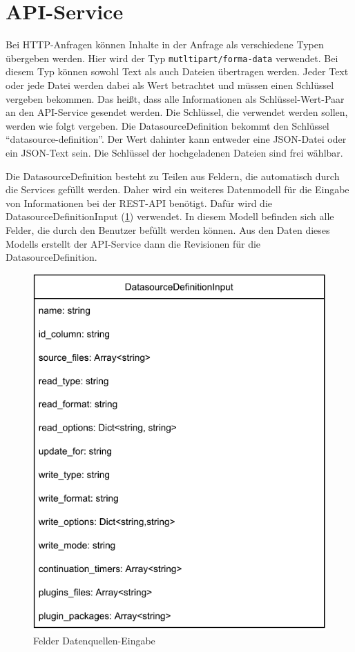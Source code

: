 \section{API-Service}

Bei HTTP-Anfragen können Inhalte in der Anfrage als verschiedene Typen übergeben werden.
Hier wird der Typ \verb|mutltipart/forma-data| verwendet.
Bei diesem Typ können sowohl Text als auch Dateien übertragen werden.
Jeder Text oder jede Datei werden dabei als Wert betrachtet und müssen einen Schlüssel vergeben bekommen.
Das heißt, dass alle Informationen als Schlüssel-Wert-Paar an den API-Service gesendet werden.
Die Schlüssel, die verwendet werden sollen, werden wie folgt vergeben.
Die DatasourceDefinition bekommt den Schlüssel "`datasource-definition"'.
Der Wert dahinter kann entweder eine JSON-Datei oder ein JSON-Text sein.
Die Schlüssel der hochgeladenen Dateien sind frei wählbar.

Die DatasourceDefinition besteht zu Teilen aus Feldern, die automatisch durch die Services gefüllt werden.
Daher wird ein weiteres Datenmodell für die Eingabe von Informationen bei der REST-API benötigt.
Dafür wird die DatasourceDefinitionInput (\cref{fig:datasource-definition-input}) verwendet.
In diesem Modell befinden sich alle Felder, die durch den Benutzer befüllt werden können.
Aus den Daten dieses Modells erstellt der API-Service dann die Revisionen für die DatasourceDefinition.

\begin{figure}
    \centering
    \includegraphics[width=.65\textwidth]{Grafiken/Umsetzung-Definition-Input.pdf}
    \caption{Felder Datenquellen-Eingabe}
    \label{fig:datasource-definition-input}
\end{figure}

